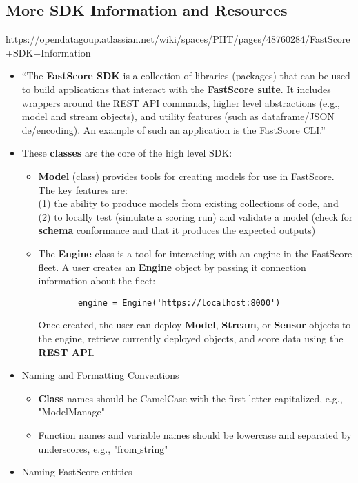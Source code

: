 \documentclass{article}
\begin{document}
\subsection*{More SDK Information and Resources}
https://opendatagoup.atlassian.net/wiki/spaces/PHT/pages/48760284/FastScore+SDK+Information
\begin{itemize}
\item ``The {\bf FastScore SDK} is a collection of libraries (packages) that can be used to build applications that interact with the {\bf FastScore suite}. It includes wrappers around the REST API commands, higher level abstractions (e.g., model and stream objects), and utility features (such as dataframe/JSON de/encoding). An example of such an application is the FastScore CLI.''
\item These {\bf classes} are the core of the high level SDK:
        \begin{itemize}
        \item {\bf Model} (class) provides tools for creating models for use in FastScore. The key features are: \\ (1) the ability to produce models from existing collections of code, and \\ (2) to locally test (simulate a scoring run) and validate a model (check for {\bf schema} conformance and that it produces the expected outputs)
        \item The {\bf Engine} class is a tool for interacting with an engine in the FastScore fleet. A user creates an {\bf Engine} object by passing it connection information about the fleet: 
        \begin{verbatim}
        engine = Engine('https://localhost:8000')
        \end{verbatim}
        Once created, the user can deploy {\bf Model}, {\bf Stream}, or {\bf Sensor} objects to the engine, retrieve currently deployed objects, and score data using the {\bf REST API}.
        \end{itemize}
\item Naming and Formatting Conventions
        \begin{itemize}
        \item {\bf Class} names should be CamelCase with the first letter capitalized, e.g., "ModelManage"
        \item Function names and variable names should be lowercase and separated by underscores, e.g., "$\text{from}\_\text{string}$"
        \end{itemize}
\item Naming FastScore entities \\

\end{itemize}
\end{document}
